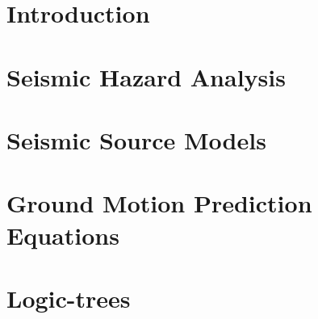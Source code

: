 \documentclass[11pt,fleqn]{book} %
\begin{document}
\chapter{Introduction}


\chapter{Seismic Hazard Analysis}


\chapter{Seismic Source Models}


\chapter{Ground Motion Prediction Equations}
\label{chap:gmpes}


\chapter{Logic-trees}


%
\end{document}
